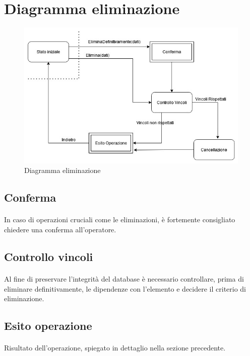 \documentclass[a4paper, 12pt]{report}
\begin{document}
        \section{Diagramma eliminazione}
            \begin{figure}[ht]
                \centering
                \includegraphics[scale=0.6]{Immagini/eliminazioneDiagramma.jpg}
                \caption{Diagramma eliminazione}
            \end{figure}
            \subsection{Conferma}
                \paragraph{}In caso di operazioni cruciali come le eliminazioni, è fortemente consigliato chiedere una conferma all'operatore.
            \subsection{Controllo vincoli}
                \paragraph{}Al fine di preservare l'integrità del database è necessario controllare, prima di eliminare definitivamente,
                le dipendenze con l'elemento e decidere il criterio di eliminazione.
            \subsection{Esito operazione}
                \paragraph{}Risultato dell'operazione, spiegato in dettaglio nella sezione precedente.
\end{document}
